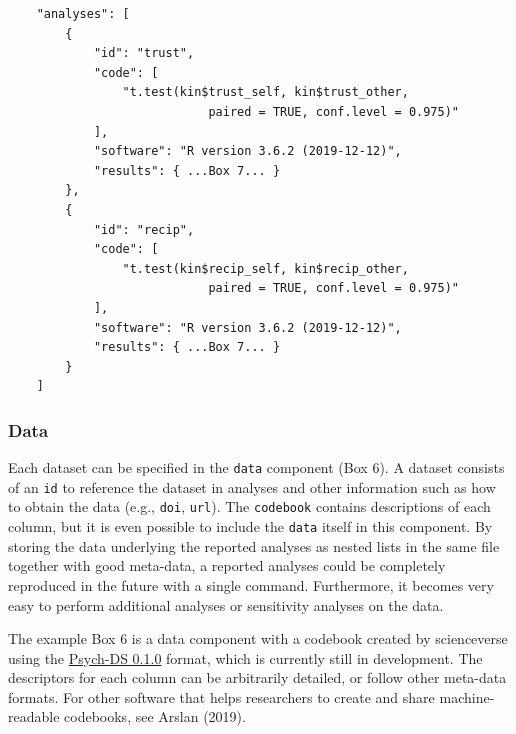 \documentclass[english,doc,floatsintext]{apa6}
\begin{document}
\begin{tcolorbox}[colback=black!5!white,colframe=white!5!black,title=Box 5. The analysis component.]
\begin{verbatim}
    "analyses": [
        {
            "id": "trust",
            "code": [
                "t.test(kin$trust_self, kin$trust_other, 
                            paired = TRUE, conf.level = 0.975)"
            ],
            "software": "R version 3.6.2 (2019-12-12)",
            "results": { ...Box 7... }
        },
        {
            "id": "recip",
            "code": [
                "t.test(kin$recip_self, kin$recip_other, 
                            paired = TRUE, conf.level = 0.975)"
            ],
            "software": "R version 3.6.2 (2019-12-12)",
            "results": { ...Box 7... }
        }
    ]
\end{verbatim}
\end{tcolorbox}

\hypertarget{data}{%
\subsubsection{Data}\label{data}}

Each dataset can be specified in the \texttt{data} component (Box 6). A dataset consists of an \texttt{id} to reference the dataset in analyses and other information such as how to obtain the data (e.g., \texttt{doi}, \texttt{url}). The \texttt{codebook} contains descriptions of each column, but it is even possible to include the \texttt{data} itself in this component. By storing the data underlying the reported analyses as nested lists in the same file together with good meta-data, a reported analyses could be completely reproduced in the future with a single command. Furthermore, it becomes very easy to perform additional analyses or sensitivity analyses on the data.

The example Box 6 is a data component with a codebook created by scienceverse using the \href{https://docs.google.com/document/d/1u8o5jnWk0Iqp_J06PTu5NjBfVsdoPbBhstht6W0fFp0/edit\#heading=h.caxnnxqaobj}{Psych-DS 0.1.0} format, which is currently still in development. The descriptors for each column can be arbitrarily detailed, or follow other meta-data formats. For other software that helps researchers to create and share machine-readable codebooks, see Arslan (2019).
\end{document}
